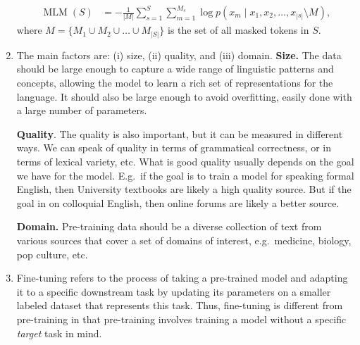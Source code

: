 \documentclass[11pt,a4paper]{article}
\newcommand\op[1]{\operatorname{#1}}
\begin{document}
\begin{enumerate}[label=(\alph*)]
\begin{align}
          \end{align}
          \begin{align}
              \op{MLM}(S) & = - \frac{1}{|M|} \sum_{s=1}^{S} \sum_{m=1}^{M_s} \log p(x_m \mid x_1, x_2, \ldots, x_{|s|} \setminus M),
          \end{align}
          where $M = \{M_1 \cup M_2 \cup \ldots \cup M_{|S|}\}$ is the set of 
          all masked tokens in $S$.
    \item The main factors are: (i) size, (ii) quality, and (iii) domain.
          \textbf{Size.} The data should be large enough to capture a wide range
          of linguistic patterns and concepts, allowing the model to learn a
          rich set of representations for the language.
          It should also be large enough to avoid overfitting, easily done with
          a large number of parameters.

          \textbf{Quality}. The quality is also important, but it can be
          measured in different ways.
          We can speak of quality in terms of grammatical correctness, or in
          terms of lexical variety, etc.
          What is good quality usually depends on the goal we have for the
          model.
          E.g.\ if the goal is to train a model for speaking formal English,
          then University textbooks are likely a high quality source.
          But if the goal in on colloquial English, then online forums are
          likely a better source.

          \textbf{Domain.} Pre-training data should be a diverse collection of
          text from various sources that cover a set of domains of interest,
          e.g.\ medicine, biology, pop culture, etc.
    \item Fine-tuning refers to the process of taking a pre-trained model and
          adapting it to a specific downstream task by updating its parameters
          on a smaller labeled dataset that represents this task.
          Thus, fine-tuning is different from pre-training in that pre-training
          involves training a model without a specific \emph{target} task
          in mind.


\end{enumerate}
\end{document}

